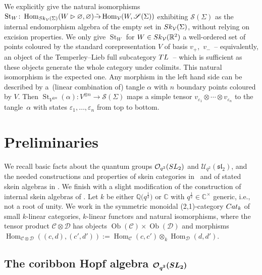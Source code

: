 \documentclass[11pt]{article}
\numberwithin{equation}{section}
\numberwithin{equation}{section}
\newcommand{\St}{\operatorname{St}}
\newcommand{\Hom}{\operatorname{Hom}}
\newcommand{\Oq}{\mathcal{O}_{q^2}({\rm SL}_2)}
\newcommand{\Uq}{\mathcal{U}_{q^2}(\mathfrak{sl}_2)}
\begin{document}
We explicitly give the natural isomorphisms $\St_W\colon\Hom_{{\rm Sk}_\mathcal{V}(\Sigma)}(W\rhd\varnothing,\varnothing) \tilde{\to} \Hom_{\mathcal{V}}(W,\mathscr{S}(\Sigma))$ exhi\-bi\-ting $\mathscr{S}(\Sigma)$ as the internal endomorphism algebra of the empty set in ${\rm Sk}_\mathcal{V}(\Sigma)$, without relying on excision properties. We only give $\St_W$ for $W\in {\rm Sk}_\mathcal{V}(\mathbb{R}^2)$ a well-ordered set of points coloured by the standard corepresentation $V$ of basis $v_+$,~$v_-$~-- equivalently, an object of the Temperley--Lieb full subcategory ${\rm TL}$~-- which is sufficient as these objects generate the whole category under colimits. This natural isomorphism is the expected one. Any morphism in the left hand side can be described by a~(linear combination of) tangle $\alpha$ with $n$ boundary points coloured by $V$. Then $\St_{V^{\otimes n}}(\alpha)\colon V^{\otimes n} \to \mathscr{S}(\Sigma)$ maps a simple tensor $v_{\varepsilon_1}\otimes\cdots \otimes v_{\varepsilon_n}$ to the tangle~$\alpha$ with states $\varepsilon_1,\dots,\varepsilon_n$ from top to bottom.

\setcounter{section}{1}
\section{Preliminaries}\label{SectPreliminaries}
We recall basic facts about the quantum groups $\Oq$ and $\Uq$, and the needed constructions and properties of skein categories in~\cite{Cooke} and of stated skein algebras in \cite{Cos}. We finish with a slight modification of the construction of internal skein algebras of \cite{Gunningham}. Let $k$ be either $\mathbb{Q}\big(q^{\frac{1}{2}}\big)$ or $\mathbb{C}$ with $q^{\frac{1}{2}} \in \mathbb{C}^\times$ generic, i.e., not a root of unity. We work in the symmetric monoidal (2,1)-category ${\rm Cat}_k$ of small $k$-linear categories, $k$-linear functors and natural isomorphisms, where the tensor product $\mathcal{C} \otimes \mathcal{D}$ has objects $\operatorname{Ob}(\mathcal{C}) \times \operatorname{Ob}(\mathcal{D})$ and morphisms $\Hom_{\mathcal{C} \otimes \mathcal{D}}((c,d),(c',d')) := \Hom_\mathcal{C}(c,c') \otimes_k \Hom_\mathcal{D}(d,d')$.

\subsection[The coribbon Hopf algebra O\_\{q\textasciicircum{}2\}(SL\_2)]
{The coribbon Hopf algebra $\boldsymbol{\Oq}$}\label{SectRibCat}
\end{document}

